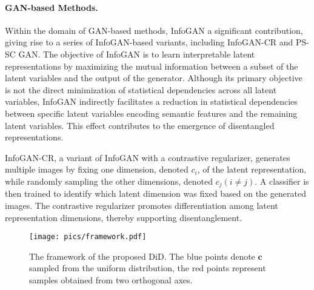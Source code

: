 \paragraph{GAN-based Methods.} Within the domain of GAN-based methods, InfoGAN \cite{chen2016infogan} a significant contribution, giving rise to a series of InfoGAN-based variants, including InfoGAN-CR\cite{lin2020infogan} and PS-SC GAN\cite{zhu2021and}. The objective of InfoGAN is to learn interpretable latent representations by maximizing the mutual information between a subset of the latent variables and the output of the generator. Although its primary objective is not the direct minimization of statistical dependencies across all latent variables, InfoGAN indirectly facilitates a reduction in statistical dependencies between specific latent variables encoding semantic features and the remaining latent variables. This effect contributes to the emergence of disentangled representations. 

InfoGAN-CR, a variant of InfoGAN with a contrastive regularizer, generates multiple images by fixing one dimension, denoted $c_i$, of the latent representation, while randomly sampling the other dimensions, denoted $c_j(i \neq j)$. A classifier is then trained to identify which latent dimension was fixed based on the generated images. The contrastive regularizer promotes differentiation among latent representation dimensions, thereby supporting disentanglement.

\begin{figure*}[htbp] 
\centering 
\texttt{[image: pics/framework.pdf]} 
\caption{ The framework of the proposed DiD. The blue points denote $\mathbf{c}$ sampled from the uniform distribution, the red points represent samples obtained from two orthogonal axes.} 
\label{fig::model} 
\end{figure*}